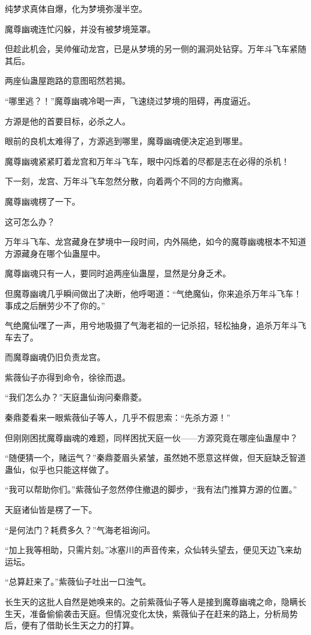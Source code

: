 \begin{this_body}
纯梦求真体自爆，化为梦境弥漫半空。

魔尊幽魂连忙闪躲，并没有被梦境笼罩。

但趁此机会，吴帅催动龙宫，已是从梦境的另一侧的漏洞处钻穿。万年斗飞车紧随其后。

两座仙蛊屋跑路的意图昭然若揭。

“哪里逃？！”魔尊幽魂冷喝一声，飞速绕过梦境的阻碍，再度逼近。

方源是他的首要目标，必杀之人。

眼前的良机太难得了，方源逃到哪里，魔尊幽魂便决定追到哪里。

魔尊幽魂紧紧盯着龙宫和万年斗飞车，眼中闪烁着的尽都是志在必得的杀机！

下一刻，龙宫、万年斗飞车忽然分散，向着两个不同的方向撤离。

魔尊幽魂楞了一下。

这可怎么办？

万年斗飞车、龙宫藏身在梦境中一段时间，内外隔绝，如今的魔尊幽魂根本不知道方源藏身在哪个仙蛊屋中。

魔尊幽魂只有一人，要同时追两座仙蛊屋，显然是分身乏术。

但魔尊幽魂几乎瞬间做出了决断，他呼喝道：“气绝魔仙，你来追杀万年斗飞车！事成之后酬劳少不了你的。”

气绝魔仙嘿了一声，用兮地吸摄了气海老祖的一记杀招，轻松抽身，追杀万年斗飞车去了。

而魔尊幽魂仍旧负责龙宫。

紫薇仙子亦得到命令，徐徐而退。

“我们怎么办？”天庭蛊仙询问秦鼎菱。

秦鼎菱看来一眼紫薇仙子等人，几乎不假思索：“先杀方源！”

但刚刚困扰魔尊幽魂的难题，同样困扰天庭一伙——方源究竟在哪座仙蛊屋中？

“随便猜一个，赌运气？”秦鼎菱眉头紧皱，虽然她不愿意这样做，但天庭缺乏智道蛊仙，似乎也只能这样做了。

“我可以帮助你们。”紫薇仙子忽然停住撤退的脚步，“我有法门推算方源的位置。”

天庭诸仙皆是楞了一下。

“是何法门？耗费多久？”气海老祖询问。

“加上我等相助，只需片刻。”冰塞川的声音传来，众仙转头望去，便见天边飞来劫运坛。

“总算赶来了。”紫薇仙子吐出一口浊气。

长生天的这批人自然是她唤来的。之前紫薇仙子等人是接到魔尊幽魂之命，隐瞒长生天，准备偷偷袭击天庭。但情况变化太快，紫薇仙子在赶来的路上，分析局势后，便有了借助长生天之力的打算。


\end{this_body}

